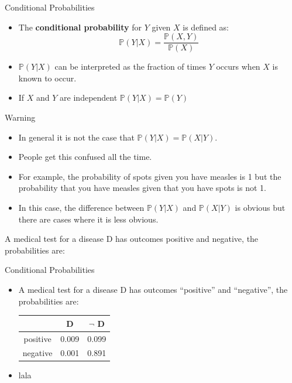 \documentclass[handout]{beamer}
\begin{document}
\begin{frame}{Conditional Probabilities}
\scriptsize{
\begin{itemize}
\item The \textbf{conditional probability} for $Y$ given $X$ is defined as:
 \begin{displaymath}
  \mathbb{P}(Y|X) = \frac{\mathbb{P}(X,Y)}{\mathbb{P}(X)}
 \end{displaymath}
 \item $\mathbb{P}(Y|X)$ can be interpreted as the fraction of times $Y$ occurs when $X$ is known to occur.
  \item  If $X$ and $Y$ are independent $\mathbb{P}(Y|X)=\mathbb{P}(Y)$
\end{itemize}

\begin{block}{Warning}
\begin{itemize}
 \item In general it is not the case that $\mathbb{P}(Y|X) = \mathbb{P}(X|Y)$. 
\item People get this confused all the time. 
\item For example, the probability of spots given you have measles is 1 but the probability that you have measles given that you have spots is not 1. 
\item In this case, the difference between $\mathbb{P}(Y|X)$ and $\mathbb{P}(X|Y)$ is obvious but there are cases where it is less obvious.
\end{itemize}

A medical test for a disease D has outcomes positive and negative,  the probabilities are:

 
\end{block}



} 
\end{frame}



\begin{frame}{Conditional Probabilities}
\scriptsize{
\begin{itemize}
\item A medical test for a disease D has outcomes ``positive'' and ``negative'',  the probabilities are:

\begin{center}
\begin{tabular}{c|cc}
& D & $\neg$ D \\  \hline
positive & 0.009 & 0.099 \\
negative & 0.001 & 0.891 \\ 
\end{tabular}
\end{center}

\item lala 
 
\end{itemize}




} 
\end{frame}
\end{document}
